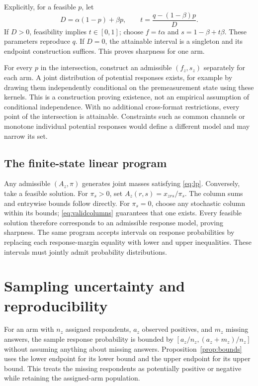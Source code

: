 \documentclass[11pt]{article}
\begin{document}
Explicitly, for a feasible $p$, let
\[
 D=\alpha(1-p)+\beta p,\qquad
 t=\frac{q-(1-\beta)p}{D}.
\]
If $D>0$, feasibility implies $t\in[0,1]$; choose $f=t\alpha$ and $s=1-\beta+t\beta$. These parameters reproduce $q$. If $D=0$, the attainable interval is a singleton and its endpoint construction suffices. This proves sharpness for one arm.

For every $p$ in the intersection, construct an admissible $(f_z,s_z)$ separately for each arm. A joint distribution of potential responses exists, for example by drawing them independently conditional on the premeasurement state using these kernels. This is a construction proving existence, not an empirical assumption of conditional independence. With no additional cross-format restrictions, every point of the intersection is attainable. Constraints such as common channels or monotone individual potential responses would define a different model and may narrow its set.

\subsection{The finite-state linear program}

Any admissible $(A_z,\pi)$ generates joint masses satisfying \eqref{eq:lp}. Conversely, take a feasible solution. For $\pi_s>0$, set $A_z(r,s)=x_{zrs}/\pi_s$. The column sums and entrywise bounds follow directly. For $\pi_s=0$, choose any stochastic column within its bounds; \eqref{eq:validcolumns} guarantees that one exists. Every feasible solution therefore corresponds to an admissible response model, proving sharpness. The same program accepts intervals on response probabilities by replacing each response-margin equality with lower and upper inequalities. These intervals must jointly admit probability distributions.

\section{Sampling uncertainty and reproducibility}
\label{app:inference}

For an arm with $n_z$ assigned respondents, $a_z$ observed positives, and $m_z$ missing answers, the sample response probability is bounded by $[a_z/n_z,(a_z+m_z)/n_z]$ without assuming anything about missing answers. Proposition~\ref{prop:bounds} uses the lower endpoint for its lower bound and the upper endpoint for its upper bound. This treats the missing respondents as potentially positive or negative while retaining the assigned-arm population.
\end{document}
